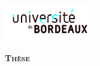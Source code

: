 \documentclass[a4paper,twoside,final]{book} %
\theoremstyle{definition}
\begin{document}
\renewcommand{\contentsname}{Sommaire}
\renewcommand*{\listtablename}{Liste des tableaux}
\renewcommand*{\listfigurename}{Liste des figures}



\begin{titlepage}
\vspace*{-2cm}\hspace*{-2cm}\includegraphics[width=0.3\textwidth]{logo/Universite_Bordeaux_CMJN-10.jpg}\\
  \begin{center}
  \textbf{\textsc{\LARGE Thèse}}\\


\end{center}
\end{titlepage}
\end{document}
